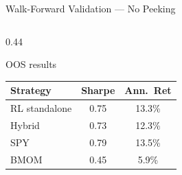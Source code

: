 \documentclass[aspectratio=169,11pt]{beamer}
\begin{document}
\begin{frame}{Walk-Forward Validation --- No Peeking}
\begin{columns}[T]
\begin{column}{0.44\textwidth}
      \begin{block}{\centering OOS results}
        \centering\vspace{0.3em}
        \begin{tabular}{lcc}
          Strategy & Sharpe & Ann.\ Ret \\
          \midrule
          RL standalone & 0.75 & 13.3\% \\
          Hybrid & 0.73 & 12.3\% \\
          SPY & 0.79 & 13.5\% \\
          BMOM & 0.45 & 5.9\% \\
        \end{tabular}
        \vspace{0.3em}
      \end{block}
    \end{column}
  \end{columns}
\end{frame}

\end{document}

